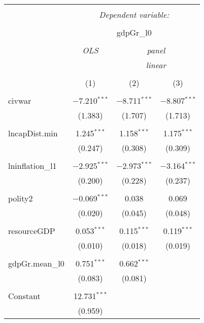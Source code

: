 \begin{table}[!htbp] \centering 
  \caption{} 
  \label{} 
\begin{tabular}{@{\extracolsep{5pt}}lccc} 
\\[-1.8ex]\hline 
\hline \\[-1.8ex] 
 & \multicolumn{3}{c}{\textit{Dependent variable:}} \\ 
\cline{2-4} 
\\[-1.8ex] & \multicolumn{3}{c}{gdpGr\_l0} \\ 
\\[-1.8ex] & \textit{OLS} & \multicolumn{2}{c}{\textit{panel}} \\ 
 & \textit{} & \multicolumn{2}{c}{\textit{linear}} \\ 
\\[-1.8ex] & (1) & (2) & (3)\\ 
\hline \\[-1.8ex] 
 civwar & $-$7.210$^{***}$ & $-$8.711$^{***}$ & $-$8.807$^{***}$ \\ 
  & (1.383) & (1.707) & (1.713) \\ 
  & & & \\ 
 lncapDist.min & 1.245$^{***}$ & 1.158$^{***}$ & 1.175$^{***}$ \\ 
  & (0.247) & (0.308) & (0.309) \\ 
  & & & \\ 
 lninflation\_l1 & $-$2.925$^{***}$ & $-$2.973$^{***}$ & $-$3.164$^{***}$ \\ 
  & (0.200) & (0.228) & (0.237) \\ 
  & & & \\ 
 polity2 & $-$0.069$^{***}$ & 0.038 & 0.069 \\ 
  & (0.020) & (0.045) & (0.048) \\ 
  & & & \\ 
 resourceGDP & 0.053$^{***}$ & 0.115$^{***}$ & 0.119$^{***}$ \\ 
  & (0.010) & (0.018) & (0.019) \\ 
  & & & \\ 
 gdpGr.mean\_l0 & 0.751$^{***}$ & 0.662$^{***}$ &  \\ 
  & (0.083) & (0.081) &  \\ 
  & & & \\ 
 Constant & 12.731$^{***}$ &  &  \\ 
  & (0.959) &  &  \\ 

\end{tabular}
\end{table}
